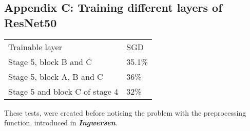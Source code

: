 \subsection*{Appendix C: Training different layers of ResNet50}\label{appendix: C}
\begin{table}[H]
\begin{tabular}{ll}
Trainable layer       & SGD                       \\
Stage 5, block B and C                         & 35.1\%                    \\ \cline{2-2}
\multicolumn{1}{l|}{Stage 5, block A, B and C} & \multicolumn{1}{l|}{36\%} \\ \cline{2-2}
Stage 5 and block C of stage 4                 & 32\%
\end{tabular}
\end{table}
These tests, were created before noticing the problem with the preprocessing function, introduced in \textbf{\textit{Ingwersen}}\autocite{Ingwersen}.
